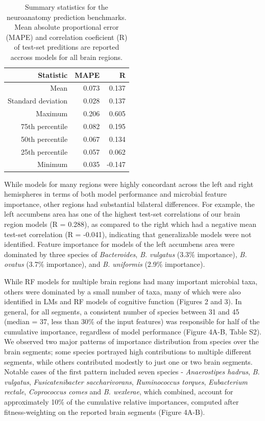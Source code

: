 \documentclass{article}
\begin{document}
\begin{table}[!h]
    \begin{center}
    \begin{tabular}{|r|r|r|}
      \hline\hline
      \textbf{Statistic} & \textbf{MAPE} & \textbf{R} \\\hline
      Mean & 0.073 & 0.137 \\
      Standard deviation & 0.028 & 0.137 \\
      Maximum & 0.206 & 0.605 \\
      75th percentile & 0.082 & 0.195 \\
      50th percentile & 0.067 & 0.134 \\
      25th percentile & 0.057 & 0.062 \\
      Minimum & 0.035 & -0.147 \\\hline\hline
    \end{tabular}
    \caption{\label{tab:neuro}Summary statistics for the neuroanatomy prediction benchmarks.
    Mean absolute proportional error (MAPE) and correlation coeficient (R)
    of test-set preditions are reported accross models for all brain regions.}
    \end{center}
\end{table}

While models for many regions were highly concordant across the
left and right hemispheres in terms of both model performance and
microbial feature importance, other regions had substantial
bilateral differences. For example, the left accumbens area
has one of the highest test-set correlations of our
brain region models (R = 0.288), as compared to the right which
had a negative mean test-set correlation (R = -0.041),
indicating that generalizable models were not identified.
Feature importance for models of the left accumbens area were dominated
by three species of \emph{Bacteroides}, \emph{B. vulgatus} (3.3\% importance),
\emph{B. ovatus} (3.7\% importance), and
\emph{B. uniformis} (2.9\% importance).

While RF models for multiple brain regions had many important microbial taxa,
others were dominated by a small number of taxa, many of which
were also identified in LMs and RF models of cognitive function (Figures 2 and 3). 
In general, for all segments, a consistent number of species between 31 and 45 (median = 37, less than 30\% of the input features)
was responsible for half of the cumulative importance,
regardless of model performance (Figure 4A-B, Table S2).
We observed two major patterns of importance distribution from
species over the brain segments; some species portrayed high contributions
to multiple different segments, while others contributed modestly to
just one or two brain segments. Notable cases of the first pattern
included seven species - \emph{Anaerostipes hadrus}, \emph{B.
vulgatus}, \emph{Fusicatenibacter saccharivorans}, \emph{Ruminococcus
torques}, \emph{Eubacterium rectale}, \emph{Coprococcus comes} and
\emph{B. wexlerae}, which combined, account for approximately 10\% of the cumulative relative importances,
computed after fitness-weighting on the reported brain segments (Figure 4A-B).
\end{document}
